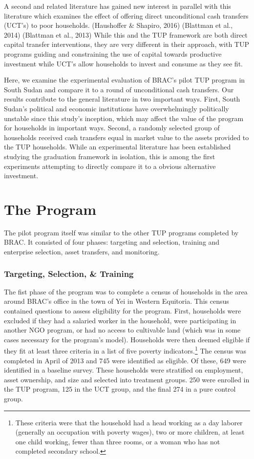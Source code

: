 \documentclass[12pt,article]{article}
\begin{document}
A second and related literature has gained new interest in parallel with this
literature which examines the effect of offering direct unconditional cash transfers
(UCT's) to poor households. (Haushoffer \& Shapiro, 2016) (Blattman et al., 2014)
(Blattman et al., 2013) While this and the TUP framework are both direct capital transfer
interventions, they are very different in their approach, with TUP programs guiding
and constraining the use of capital towards productive investment while UCT's allow
households to invest and consume as they see fit.

Here, we examine the experimental evaluation of BRAC's pilot TUP program in South
Sudan and compare it to a round of unconditional cash transfers. Our results
contribute to the general literature in two important ways. First, South Sudan's
political and economic institutions have overwhelmingly politically unstable since
this study's inception, which may affect the value of the program for
households in important ways. Second, a randomly selected group of households
received cash transfers equal in market value to the assets provided to the TUP
households. While an experimental literature has been established studying the
graduation framework in isolation, this is among the first experiments attempting to
directly compare it to a obvious alternative investment.

\section{The Program}
\label{sec-2}

The pilot program itself was similar to the other TUP programs completed by BRAC. It
consisted of four phases: targeting and selection, training and enterprise selection,
asset transfers, and monitoring. 

\subsubsection{Targeting, Selection, \& Training}
\label{sec-2-0-1}

The fist phase of the program was to complete a census of households in the area
around BRAC's office in the town of Yei in Western Equitoria. This census contained
questions to assess eligibility for the program. First, households were excluded if
they had a salaried worker in the household, were participating in another NGO
program, or had no access to cultivable land (which was in some cases necessary for
the program's model). Households were then deemed eligible if they fit at least three
criteria in a list of five poverty indicators.\footnote{These criteria were that the
household had a head working as a day laborer (generally an occupation with poverty
wages), two or more children, at least one child working, fewer than three rooms, or
a woman who has not completed secondary school.} The census was completed in April of
2013 and 745 were identified as eligible. Of these, 649 were identified in a baseline
survey. These households were stratified on employment, asset ownership, and size and
selected into treatment groups. 250 were enrolled in the TUP program, 125 in the UCT
group, and the final 274 in a pure control group.
\end{document}
